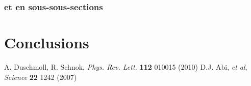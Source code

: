 \documentclass[a4paper,12pt,twoside]{article}
\begin{document}
\subsubsection{et en sous-sous-sections}


\section{Conclusions}



\begin{thebibliography}{99}
 A. Duschmoll, R. Schnok, {\it Phys. Rev. Lett.} {\bf 112} 010015 (2010)
 D.J. Abi, {\it et al}, {\it Science} {\bf 22} 1242 (2007)
\end{thebibliography}
\end{document}
